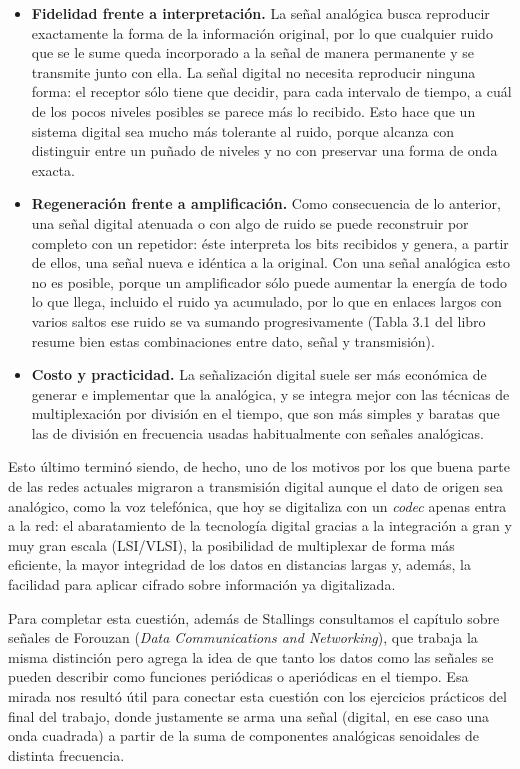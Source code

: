 \documentclass[11pt,a4paper]{article}
\begin{document}
\begin{itemize}
  \item \textbf{Fidelidad frente a interpretación.} La señal analógica busca reproducir exactamente la forma de la información original, por lo que cualquier ruido que se le sume queda incorporado a la señal de manera permanente y se transmite junto con ella. La señal digital no necesita reproducir ninguna forma: el receptor sólo tiene que decidir, para cada intervalo de tiempo, a cuál de los pocos niveles posibles se parece más lo recibido. Esto hace que un sistema digital sea mucho más tolerante al ruido, porque alcanza con distinguir entre un puñado de niveles y no con preservar una forma de onda exacta.
  \item \textbf{Regeneración frente a amplificación.} Como consecuencia de lo anterior, una señal digital atenuada o con algo de ruido se puede reconstruir por completo con un repetidor: éste interpreta los bits recibidos y genera, a partir de ellos, una señal nueva e idéntica a la original. Con una señal analógica esto no es posible, porque un amplificador sólo puede aumentar la energía de todo lo que llega, incluido el ruido ya acumulado, por lo que en enlaces largos con varios saltos ese ruido se va sumando progresivamente (Tabla 3.1 del libro resume bien estas combinaciones entre dato, señal y transmisión).
  \item \textbf{Costo y practicidad.} La señalización digital suele ser más económica de generar e implementar que la analógica, y se integra mejor con las técnicas de multiplexación por división en el tiempo, que son más simples y baratas que las de división en frecuencia usadas habitualmente con señales analógicas.
\end{itemize}

Esto último terminó siendo, de hecho, uno de los motivos por los que buena parte de las redes actuales migraron a transmisión digital aunque el dato de origen sea analógico, como la voz telefónica, que hoy se digitaliza con un \textit{codec} apenas entra a la red: el abaratamiento de la tecnología digital gracias a la integración a gran y muy gran escala (LSI/VLSI), la posibilidad de multiplexar de forma más eficiente, la mayor integridad de los datos en distancias largas y, además, la facilidad para aplicar cifrado sobre información ya digitalizada.

Para completar esta cuestión, además de Stallings consultamos el capítulo sobre señales de Forouzan (\textit{Data Communications and Networking}), que trabaja la misma distinción pero agrega la idea de que tanto los datos como las señales se pueden describir como funciones periódicas o aperiódicas en el tiempo. Esa mirada nos resultó útil para conectar esta cuestión con los ejercicios prácticos del final del trabajo, donde justamente se arma una señal (digital, en ese caso una onda cuadrada) a partir de la suma de componentes analógicas senoidales de distinta frecuencia.
\end{document}
